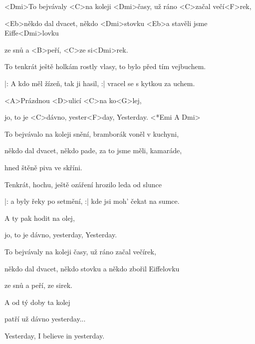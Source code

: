 

\zs
<Dmi>To bejvávaly <C>na koleji <Dmi>časy,
už ráno <C>začal večí<F>rek,

<Eb>někdo dal dvacet, někdo <Dmi>stovku
<Eb>a stavěli jsme Eiffe<Dmi>lovku

ze snů a <B>peří, <C>ze si<Dmi>rek.
\ks

\zs
To tenkrát ještě holkám rostly vlasy,
to bylo před tím vejbuchem.

|: A kdo měl žízeň, tak ji hasil, :|
vracel se s kytkou za uchem.
\ks

\zr
<A>Prázdnou <D>ulicí <C>na ko<G>lej,

jo, to je <C>dávno, yester<F>day, Yesterday.
<*Emi A Dmi>
\kr

\zs
To bejvávalo na koleji snění,
bramborák voněl v kuchyni,

někdo dal dvacet, někdo pade,
za to jsme měli, kamaráde,

hned štěně piva ve skříni.
\ks

\zs
Tenkrát, hochu, ještě ozáření
hrozilo leda od slunce

|: a byly řeky po setmění, :|
kde jsi moh' čekat na sumce.
\ks

\zr
A ty pak hodit na olej,

jo, to je dávno, yesterday, Yesterday.
\kr

\zs
To bejvávaly na koleji časy,
už ráno začal večírek,

někdo dal dvacet, někdo stovku
a někdo zbořil Eiffelovku

ze snů a peří, ze sirek.
\ks

\zr
A od tý doby ta kolej

patří už dávno yesterday...

Yesterday, I believe in yesterday.
\kr

\kp
